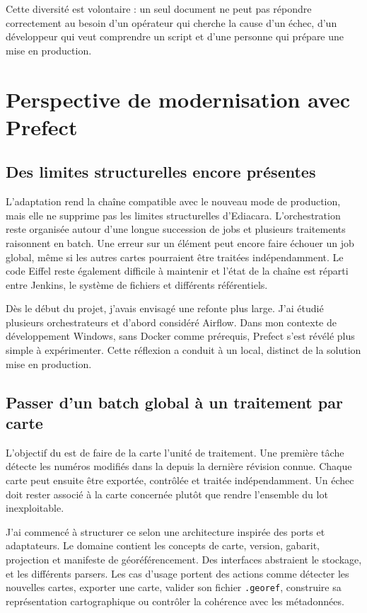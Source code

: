 Cette diversité est volontaire : un seul document ne peut pas répondre correctement au besoin d'un opérateur qui cherche la cause d'un échec, d'un développeur qui veut comprendre un script et d'une personne qui prépare une mise en production.

\section{Perspective de modernisation avec Prefect}

\subsection{Des limites structurelles encore présentes}

L'adaptation  rend la chaîne compatible avec le nouveau mode de production, mais elle ne supprime pas les limites structurelles d'Ediacara. L'orchestration reste organisée autour d'une longue succession de jobs et plusieurs traitements raisonnent en batch. Une erreur sur un élément peut encore faire échouer un job global, même si les autres cartes pourraient être traitées indépendamment. Le code Eiffel reste également difficile à maintenir et l'état de la chaîne est réparti entre Jenkins, le système de fichiers et différents référentiels.

Dès le début du projet, j'avais envisagé une refonte plus large. J'ai étudié plusieurs orchestrateurs et d'abord considéré Airflow. Dans mon contexte de développement Windows, sans Docker comme prérequis, Prefect s'est révélé plus simple à expérimenter. Cette réflexion a conduit à un  local, distinct de la solution  mise en production.

\subsection{Passer d'un batch global à un traitement par carte}

L'objectif du  est de faire de la carte l'unité de traitement. Une première tâche détecte les numéros modifiés dans la  depuis la dernière révision connue. Chaque carte peut ensuite être exportée, contrôlée et traitée indépendamment. Un échec doit rester associé à la carte concernée plutôt que rendre l'ensemble du lot inexploitable.

J'ai commencé à structurer ce  selon une architecture inspirée des ports et adaptateurs. Le domaine contient les concepts de carte, version, gabarit, projection et manifeste de géoréférencement. Des interfaces abstraient le stockage,  et les différents parsers. Les cas d'usage portent des actions comme détecter les nouvelles cartes, exporter une carte, valider son fichier \texttt{.georef}, construire sa représentation cartographique ou contrôler la cohérence avec les métadonnées.


